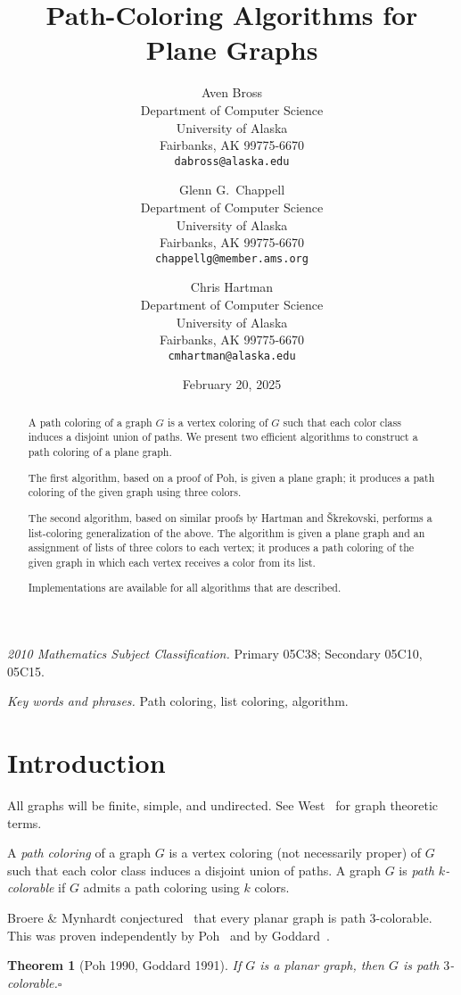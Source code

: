 \documentclass[12pt,letterpaper]{article}
\date{February 20, 2025}
\title{Path-Coloring Algorithms for Plane Graphs}
\author{Aven Bross\\
\small Department of Computer Science\\
\small University of Alaska\\
\small Fairbanks, AK 99775-6670\\
\small\texttt{dabross@alaska.edu} \and
Glenn G.~Chappell\\
\small Department of Computer Science\\
\small University of Alaska\\
\small Fairbanks, AK 99775-6670\\
\small\texttt{chappellg{@}member.ams.org} \and
Chris Hartman\\
\small Department of Computer Science\\
\small University of Alaska\\
\small Fairbanks, AK 99775-6670\\
\small\texttt{cmhartman{@}alaska.edu}}
\theoremstyle{plain}
\newtheorem{theorem}[lemma]{Theorem}         %
\theoremstyle{definition}
\theoremstyle{break}
\newcommand{\ggcqedsymbol}{$\square$}
\newcommand{\ggcqed}{\hbox{}\nobreak\hbox{\quad\ggcqedsymbol}}
\newcommand{\ggcnopf}{\ggcqed}
\newcommand{\defterm}[1]{\emph{#1}} %
\newcommand{\abstdefterm}[1]{#1} %
\begin{document}
\maketitle
\centerline{\small \textit{2010 Mathematics Subject Classification.}
 Primary 05C38; Secondary 05C10, 05C15.}
\centerline{\small \textit{Key words and phrases.}
 Path coloring, list coloring, algorithm.}

\begin{abstract}
A \abstdefterm{path coloring} of a graph $G$ is a vertex coloring
of $G$ such that each color class induces a disjoint union of paths.
We present two efficient algorithms
to construct a path coloring of a plane graph.

The first algorithm, based on a proof of Poh, %
is given a plane graph;
it produces a path coloring of the given graph
using three colors.

The second algorithm,
based on similar proofs
by Hartman %
and \v{S}krekovski, %
performs a list-coloring generalization of the above.
The algorithm is given a plane graph and an assignment of lists of
three colors to each vertex;
it produces a path coloring of the given graph
in which each vertex receives a color from its list.

Implementations are available for all algorithms that are described.
\end{abstract}

\section{Introduction}

All graphs will be finite, simple, and undirected.
See West~\cite{Wes2000} for graph theoretic terms.

A \defterm{path coloring} of a graph $G$ is a vertex coloring
(not necessarily proper) of $G$ such that each color class induces
a disjoint union of paths.
A graph $G$ is \defterm{path $k$-colorable} if $G$
admits a path coloring using $k$ colors.

Broere \& Mynhardt conjectured~\cite[Conj.~16]{BrMy1985}
that every planar graph is path $3$-colorable.
This was proven independently by Poh~\cite[Thm.~2]{Poh1990}
and by Goddard~\cite[Thm.~1]{God1991}.

\begin{theorem}[Poh 1990, Goddard 1991]\label{T:planar3c}
If $G$ is a planar graph,
then $G$ is path $3$-colorable.\ggcnopf\end{theorem}
\end{document}
